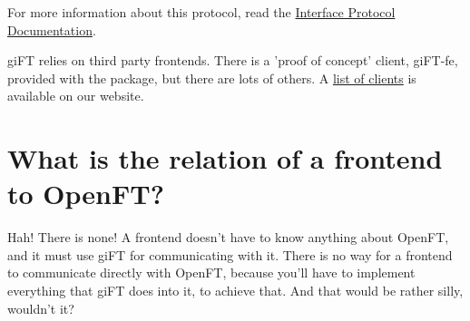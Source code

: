 \documentclass[10pt]{article}
\begin{document}
For more information about this protocol, read the
\href{http://gift.sourceforge.net/docs/?document=interface.html}{Interface
Protocol Documentation}.

giFT relies on third party frontends. There is a 'proof of concept' client,
giFT-fe, provided with the package, but there are lots of others. A
\href{http://gift.sourceforge.net/dev/clients.php}{list of clients} is
available on our website.

\section{What is the relation of a frontend to OpenFT?}
Hah! There is none! A frontend doesn't have to know anything about OpenFT, and
it must use giFT for communicating with it. There is no way for a frontend to
communicate directly with OpenFT, because you'll have to implement everything
that giFT does into it, to achieve that. And that would be rather silly,
wouldn't it?
\end{document}
